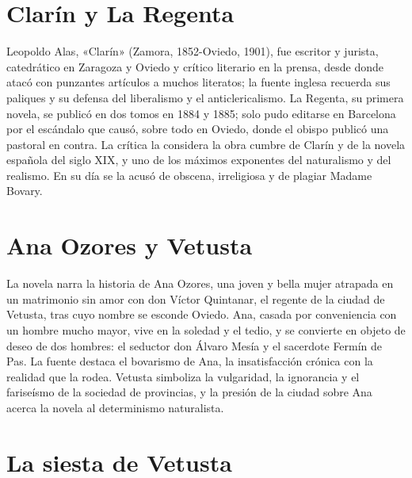 \documentclass{book}
\begin{document}

\section{Clarín y La Regenta}

Leopoldo Alas, «Clarín» (Zamora, 1852-Oviedo, 1901), fue escritor y jurista, catedrático en Zaragoza y Oviedo y crítico literario en la prensa, desde donde atacó con punzantes artículos a muchos literatos; la fuente inglesa recuerda sus paliques y su defensa del liberalismo y el anticlericalismo. La Regenta, su primera novela, se publicó en dos tomos en 1884 y 1885; solo pudo editarse en Barcelona por el escándalo que causó, sobre todo en Oviedo, donde el obispo publicó una pastoral en contra. La crítica la considera la obra cumbre de Clarín y de la novela española del siglo XIX, y uno de los máximos exponentes del naturalismo y del realismo. En su día se la acusó de obscena, irreligiosa y de plagiar Madame Bovary.


\section{Ana Ozores y Vetusta}

La novela narra la historia de Ana Ozores, una joven y bella mujer atrapada en un matrimonio sin amor con don Víctor Quintanar, el regente de la ciudad de Vetusta, tras cuyo nombre se esconde Oviedo. Ana, casada por conveniencia con un hombre mucho mayor, vive en la soledad y el tedio, y se convierte en objeto de deseo de dos hombres: el seductor don Álvaro Mesía y el sacerdote Fermín de Pas. La fuente destaca el bovarismo de Ana, la insatisfacción crónica con la realidad que la rodea. Vetusta simboliza la vulgaridad, la ignorancia y el fariseísmo de la sociedad de provincias, y la presión de la ciudad sobre Ana acerca la novela al determinismo naturalista.


\section{La siesta de Vetusta}
\end{document}
